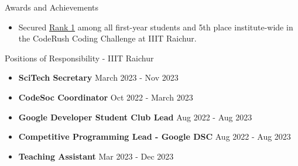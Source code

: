\documentclass{resume}
\begin{document}
\begin{rSection}{Awards and Achievements}

    \begin{itemize}
        \itemsep -3pt {}
        \item Secured \href{https://drive.google.com/file/d/1BdOPAlKCXyNEZf-ujJ5Iu8lBBra77hJg/view?usp=sharing}{Rank 1} among all first-year students and 5th place institute-wide in the CodeRush Coding Challenge at IIIT Raichur.
    \end{itemize}

\end{rSection}


\begin{rSection}{Positions of Responsibility - IIIT Raichur}
    \begin{itemize}
        \itemsep -3pt {}
        \item \textbf{SciTech Secretary} \hfill March 2023 - Nov 2023
        \item \textbf{CodeSoc Coordinator} \hfill Oct 2022 - March 2023
        \item \textbf{Google Developer Student Club Lead} \hfill Aug 2022 - Aug 2023
        \item \textbf{Competitive Programming Lead - Google DSC} \hfill Aug 2022 - Aug 2023
        \item \textbf{Teaching Assistant} \hfill Mar 2023 - Dec 2023
    \end{itemize}
\end{rSection}
\end{document}
